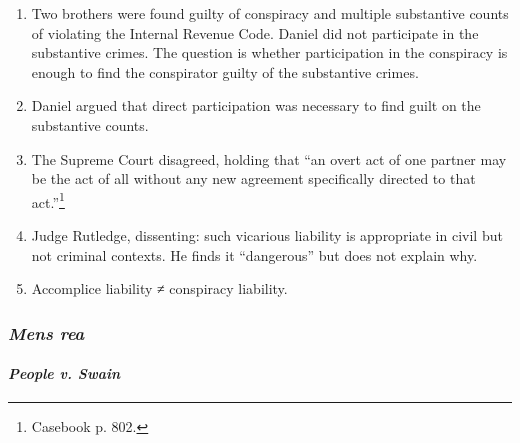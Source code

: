 \begin{enumerate}
    \item Two brothers were found guilty of conspiracy and multiple 
    substantive counts of violating the Internal Revenue Code. Daniel did not 
    participate in the substantive crimes. The question is whether 
    participation in the conspiracy is enough to find the conspirator guilty 
    of the substantive crimes.
    \item Daniel argued that direct participation was necessary to find guilt 
    on the substantive counts.
    \item The Supreme Court disagreed, holding that ``an overt act of one 
    partner may be the act of all without any new agreement specifically 
    directed to that act.''\footnote{Casebook p. 802.}
    \item Judge Rutledge, dissenting: such vicarious liability is appropriate 
    in civil but not criminal contexts. He finds it ``dangerous'' but does not 
    explain why.
    \item Accomplice liability ≠ conspiracy liability.
\end{enumerate}

\subsubsection{\emph{Mens rea}}

\paragraph{\emph{People v. Swain}}

